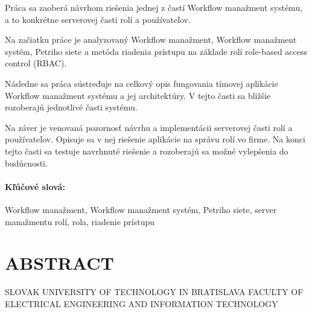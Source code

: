 \documentclass[12pt, oneside]{book}
\begin{document}
\noindent Práca sa zaoberá návrhom riešenia jednej z častí Workflow manažment systému, a to konkrétne serverovej časti rolí a používateľov.

\noindent Na začiatku práce je analyzovaný Workflow manažment, Workflow manažment systém, Petriho siete a metóda riadenia prístupu na základe rolí role-based access control (RBAC).

\noindent Následne sa práca sústreďuje na celkový opis fungovania tímovej aplikácie Workflow manažment systému a jej architektúry. V tejto časti sa bližšie rozoberajú jednotlivé časti systému. 

 \noindent Na záver je venovaná pozornosť návrhu a implementácii serverovej časti rolí a používateľov. Opisuje sa v nej riešenie aplikácie na správu rolí vo firme. Na konci tejto časti sa testuje navrhnuté riešenie a rozoberajú sa možné vylepšenia do budúcnosti.

 
\paragraph*{Kľúčové slová:} 
 Workflow manažment, Workflow manažment systém, Petriho siete, server manažmentu rolí, rola, riadenie prístupu

\newpage
\pagestyle{empty}	
\section*{\fontsize{21pt}{1.3}\selectfont ABSTRACT}
 
	\noindent SLOVAK UNIVERSITY OF TECHNOLOGY IN BRATISLAVA
	\newline
	{\fontsize{11pt}{1.3}\selectfont FACULTY OF ELECTRICAL ENGINEERING AND INFORMATION TECHNOLOGY\\ }
	
\end{document}
